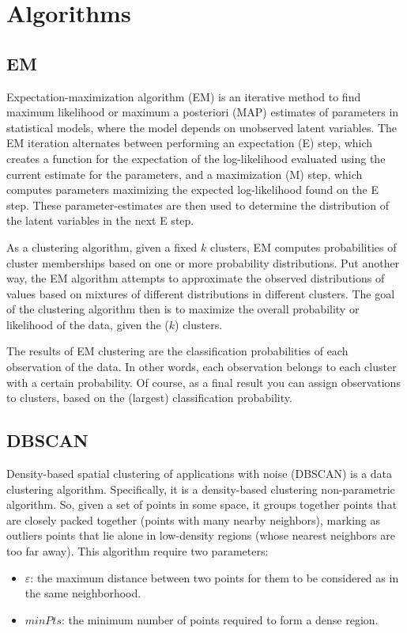 \section{Algorithms}
\subsection{EM}
Expectation-maximization algorithm (EM) \cite{em,wiki_em,rapid_em} is an iterative method to find maximum likelihood or maximum a posteriori (MAP) estimates of parameters in statistical models, where the model depends on unobserved latent variables. The EM iteration alternates between performing an expectation (E) step, which creates a function for the expectation of the log-likelihood evaluated using the current estimate for the parameters, and a maximization (M) step, which computes parameters maximizing the expected log-likelihood found on the E step. These parameter-estimates are then used to determine the distribution of the latent variables in the next E step.

As a clustering algorithm, given a fixed $k$ clusters, EM computes probabilities of cluster memberships based on one or more probability distributions. Put another way, the EM algorithm attempts to approximate the observed distributions of values based on mixtures of different distributions in different clusters. The goal of the clustering algorithm then is to maximize the overall probability or likelihood of the data, given the ($k$) clusters.

The results of EM clustering are the classification probabilities of each observation of the data. In other words, each observation belongs to each cluster with a certain probability. Of course, as a final result you can assign observations to clusters, based on the (largest) classification probability.

\subsection{DBSCAN}
Density-based spatial clustering of applications with noise (DBSCAN) \cite{dbscan,wiki_dbscan} is a data clustering algorithm. Specifically, it is a density-based clustering non-parametric algorithm. So, given a set of points in some space, it groups together points that are closely packed together (points with many nearby neighbors), marking as outliers points that lie alone in low-density regions (whose nearest neighbors are too far away). This algorithm require two parameters:
\begin{itemize}
    \item $\varepsilon$: the maximum distance between two points for them to be considered as in the same neighborhood.
    \item $minPts$: the minimum number of points required to form a dense region.
\end{itemize}

